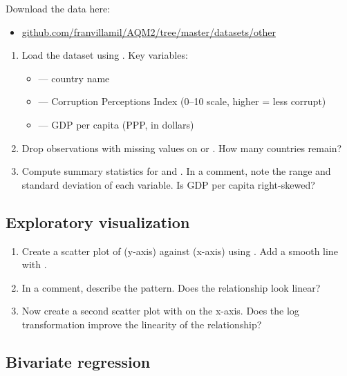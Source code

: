 Download the data here:
\begin{itemize}
  \item \href{https://github.com/franvillamil/AQM2/tree/master/datasets/other}{github.com/franvillamil/AQM2/tree/master/datasets/other}
\end{itemize}

\begin{enumerate}[label=\alph*)]
  \item Load the  dataset using . Key variables:
  \begin{itemize}
    \item {} --- country name
    \item {} --- Corruption Perceptions Index (0--10 scale, higher = less corrupt)
    \item {} --- GDP per capita (PPP, in dollars)
  \end{itemize}
  \item Drop observations with missing values on  or . How many countries remain?
  \item Compute summary statistics for  and . In a comment, note the range and standard deviation of each variable. Is GDP per capita right-skewed?
\end{enumerate}

\subsection{Exploratory visualization}

\begin{enumerate}[label=\alph*)]
  \item Create a scatter plot of  (y-axis) against  (x-axis) using . Add a smooth line with .
  \item In a comment, describe the pattern. Does the relationship look linear?
  \item Now create a second scatter plot with  on the x-axis. Does the log transformation improve the linearity of the relationship?
\end{enumerate}

\subsection{Bivariate regression}

